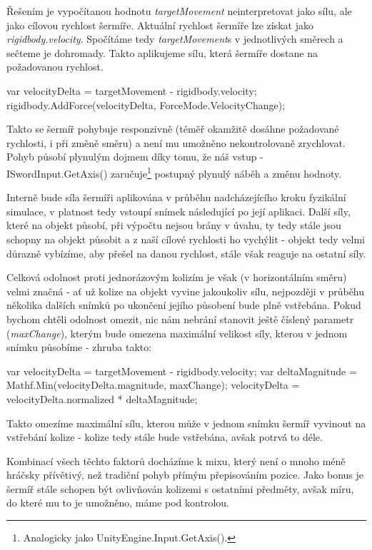Řešením je vypočítanou hodnotu \textit{targetMovement} neinterpretovat jako sílu, ale jako cílovou rychlost šermíře. Aktuální rychlost šermíře lze získat jako \textit{rigidbody.velocity}. Spočítáme tedy \textit{targetMovement}s v jednotlivých směrech a sečteme je dohromady. Takto aplikujeme sílu, která šermíře dostane na požadovanou rychlost. 

\begin{code}
 var velocityDelta = targetMovement - rigidbody.velocity;
 rigidbody.AddForce(velocityDelta, ForceMode.VelocityChange);
\end{code}


Takto se šermíř pohybuje responzivně (téměř okamžitě dosáhne požadované rychlosti, i při změně směru) a není mu umožněno nekontrolovaně zrychlovat. Pohyb působí plynulým dojmem díky tomu, že náš vstup - ISwordInput.GetAxis() zaručuje\footnote{Analogicky jako UnityEngine.Input.GetAxis().} postupný plynulý náběh a změnu hodnoty.

Interně bude síla šermíři aplikována v průběhu nadcházejícího kroku fyzikální simulace, v platnost tedy vstoupí snímek následující po její aplikaci. Další síly, které na objekt působí, při výpočtu nejsou brány v úvahu, ty tedy stále jsou schopny na objekt působit a z naší cílové rychlosti ho vychýlit - objekt tedy velmi důrazně vybízíme, aby přešel na danou rychlost, stále však reaguje na ostatní síly. 

Celková odolnost proti jednorázovým kolizím je však (v horizontálním směru) velmi značná - ať už kolize na objekt vyvine jakoukoliv sílu, nejpozději v průběhu několika dalších snímků po ukončení jejího působení bude plně vstřebána. Pokud bychom chtěli odolnost omezit, nic nám nebrání stanovit ještě číslený parametr (\textit{maxChange}), kterým bude omezena maximální velikost síly, kterou v jednom snímku působíme - zhruba takto:

\begin{code}
 var velocityDelta = targetMovement - rigidbody.velocity;
 var deltaMagnitude = Mathf.Min(velocityDelta.magnitude, maxChange);
 velocityDelta = velocityDelta.normalized * deltaMagnitude;
\end{code}

Takto omezíme maximální sílu, kterou může v jednom snímku šermíř vyvinout na vstřebání kolize - kolize tedy stále bude vstřebána, avšak potrvá to déle.

Kombinací všech těchto faktorů docházíme k mixu, který není o mnoho méně hráčsky přívětivý, než tradiční pohyb přímým přepisováním pozice. Jako bonus je šermíř stále schopen být ovlivňován kolizemi s ostatními předměty, avšak míru, do které mu to je umožněno, máme pod kontrolou.


